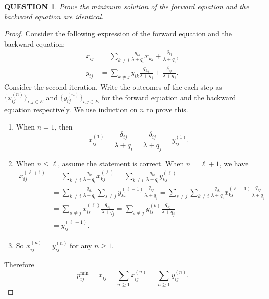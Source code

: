 \documentclass[12pt]{article}
\renewcommand{\(}{\left(}%
\renewcommand{\)}{\right)}%
\renewcommand{\[}{\left[}%
\renewcommand{\]}{\right]}%
\newtheorem{question}{QUESTION}[section]}
\newtheorem{proof}{Proof.}}
\begin{document}
  \begin{question}
  	Prove the minimum solution of the forward equation and the backward equation are identical.
  \end{question}
  \begin{proof}
  	Consider the following expression of the forward equation and the backward equation:
  	\begin{equation*}
  		\begin{split}
  			x_{ij}&=\sum_{k\neq i}\frac{q_{ik}}{\lambda+q_i}x_{kj}+\frac{\delta_{ij}}{\lambda+q_i},\\
  			y_{ij}&=\sum_{k\neq j}y_{ik}\frac{q_{kj}}{\lambda+q_j}+\frac{\delta_{ij}}{\lambda+q_j}.
  		\end{split}
  	\end{equation*}
  	Consider the second iteration. Write the outcomes of the each step as $\{x_{ij}^{(n)}\}_{i,j\in E}$ and $\{y_{ij}^{(n)}\}_{i,j\in E}$ for the forward equation and the backward equation respectively. We use induction on $n$ to prove this. 
  	\begin{enumerate}
  		\item When $n=1$, then 
  		\begin{equation*}
  			x_{ij}^{(1)}=\frac{\delta_{ij}}{\lambda+q_i}=\frac{\delta_{ij}}{\lambda+q_j}=y_{ij}^{(1)}.
  		\end{equation*}
  		\item When $n\leq \ell$, assume the statement is correct. When $n=\ell+1$, we have
  		\begin{equation*}
  			\begin{split}
  				x_{ij}^{(\ell+1)}&=\sum_{k\neq i}\frac{q_{ik}}{\lambda+q_i}x_{kj}^{(\ell)}=\sum_{k\neq i}\frac{q_{ik}}{\lambda+q_i}y_{kj}^{(\ell)}\\
  				&=\sum_{k\neq i}\frac{q_{ik}}{\lambda+q_i}\sum_{s\neq j}y_{ks}^{(\ell-1)}\frac{q_{s j}}{\lambda+q_j}=\sum_{s\neq j}\sum_{k\neq i}\frac{q_{ik}}{\lambda+q_i}x_{ks}^{(\ell-1)}\frac{q_{s j}}{\lambda+q_j}\\
  				&=\sum_{s\neq j}x_{is}^{(\ell)}\frac{q_{s j}}{\lambda+q_j}=\sum_{s\neq j}y_{is}^{(k)}\frac{q_{s j}}{\lambda+q_j}\\
  				&=y_{ij}^{(\ell+1)}.
  			\end{split}
  		\end{equation*}
  		\item So $x_{ij}^{(n)}=y_{ij}^{(n)}$ for any $n\geq 1$.
  	\end{enumerate}
  	Therefore 
  	\begin{equation*}
  		p^\text{min}_{ij}=x_{ij}=\sum_{n\geq 1}x_{ij}^{(n)}=\sum_{n\geq 1}y_{ij}^{(n)}.
  	\end{equation*}
  \end{proof}
  
\end{document}
